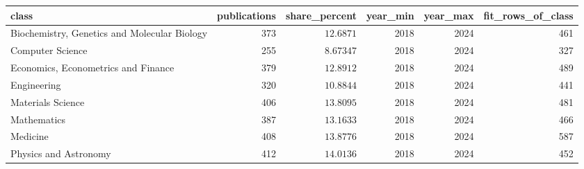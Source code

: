 \begin{tabular}{lrrrrr}
\toprule
class & publications & share\_percent & year\_min & year\_max & fit\_rows\_of\_class \\
\midrule
Biochemistry, Genetics and Molecular Biology & 373 & $12.6871$ & 2018 & 2024 & 461 \\
Computer Science & 255 & $8.67347$ & 2018 & 2024 & 327 \\
Economics, Econometrics and Finance & 379 & $12.8912$ & 2018 & 2024 & 489 \\
Engineering & 320 & $10.8844$ & 2018 & 2024 & 441 \\
Materials Science & 406 & $13.8095$ & 2018 & 2024 & 481 \\
Mathematics & 387 & $13.1633$ & 2018 & 2024 & 466 \\
Medicine & 408 & $13.8776$ & 2018 & 2024 & 587 \\
Physics and Astronomy & 412 & $14.0136$ & 2018 & 2024 & 452 \\
\bottomrule
\end{tabular}
